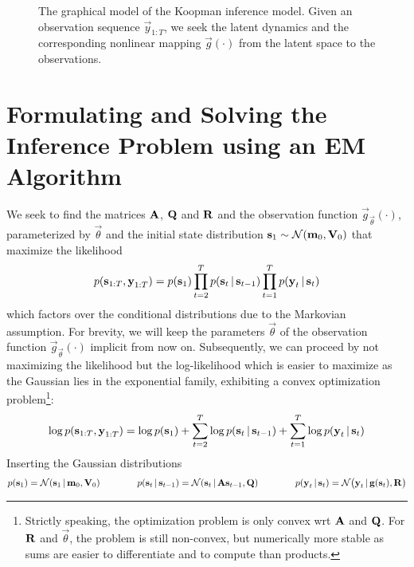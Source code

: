 \begin{figure}
	\centering
	\tikzNonlinearGaussianKoopman
	\caption[Graphical model of the Koopman inference model]{The graphical model of the Koopman inference model. Given an observation sequence \( \vec{y}_{1:T} \), we seek the latent dynamics and the corresponding nonlinear mapping \( \vec{g}(\cdot) \) from the latent space to the observations.}
	\label{fig:nonlinearGaussianKoopman}
\end{figure}

\section{Formulating and Solving the Inference Problem using an EM Algorithm}
	\label{sec:ngkDerivation}

	We seek to find the matrices \(\boldsymbol{\mathrm{A}}\), \(\boldsymbol{\mathrm{Q}}\) and \(\boldsymbol{\mathrm{R}}\) and the observation function \( \vec{g}_{\vec{\theta}}(\cdot) \), parameterized by \(\vec{\theta}\) and the initial state distribution \( \boldsymbol{\mathrm{s}}_1 \sim \mathcal{N}(\boldsymbol{\mathrm{m}}_0, \boldsymbol{\mathrm{V}}_0) \) that maximize the likelihood
	\begin{equation*}
		p(\boldsymbol{\mathrm{s}}_{1:T}, \boldsymbol{\mathrm{y}}_{1:T}) = p(\boldsymbol{\mathrm{s}}_1) \prod_{t = 2}^{T} p(\boldsymbol{\mathrm{s}}_t \,\vert\, \boldsymbol{\mathrm{s}}_{t - 1}) \prod_{t = 1}^{T} p(\boldsymbol{\mathrm{y}}_t \,\vert\, \boldsymbol{\mathrm{s}}_t)
	\end{equation*}
	which factors over the conditional distributions due to the Markovian assumption. For brevity, we will keep the parameters \( \vec{\theta} \) of the observation function \( \vec{g}_{\vec{\theta}}(\cdot) \) implicit from now on. Subsequently, we can proceed by not maximizing the likelihood but the log-likelihood which is easier to maximize as the Gaussian lies in the exponential family, exhibiting a convex optimization problem\footnote{Strictly speaking, the optimization problem is only convex \ac{wrt} \(\boldsymbol{\mathrm{A}}\) and \(\boldsymbol{\mathrm{Q}}\). For \(\boldsymbol{\mathrm{R}}\) and \(\vec{\theta}\), the problem is still non-convex, but numerically more stable as sums are easier to differentiate and to compute than products.}:
	\begin{equation*}
		\log p(\boldsymbol{\mathrm{s}}_{1:T}, \boldsymbol{\mathrm{y}}_{1:T}) = \log p(\boldsymbol{\mathrm{s}}_1) + \sum_{t = 2}^{T} \log p(\boldsymbol{\mathrm{s}}_t \,\vert\, \boldsymbol{\mathrm{s}}_{t - 1}) + \sum_{t = 1}^{T} \log p(\boldsymbol{\mathrm{y}}_t \,\vert\, \boldsymbol{\mathrm{s}}_t)
	\end{equation*}
	Inserting the Gaussian distributions
	\begin{equation*}
		p(\boldsymbol{\mathrm{s}}_1) = \mathcal{N}(\boldsymbol{\mathrm{s}}_1 \,\vert\, \boldsymbol{\mathrm{m}}_0, \boldsymbol{\mathrm{V}}_0) \qquad\qquad
		p(\boldsymbol{\mathrm{s}}_t \,\vert\, \boldsymbol{\mathrm{s}}_{t - 1}) = \mathcal{N}(\boldsymbol{\mathrm{s}}_t \,\vert\, \boldsymbol{\mathrm{A}} \boldsymbol{\mathrm{s}}_{t - 1}, \boldsymbol{\mathrm{Q}}) \qquad\qquad
		p(\boldsymbol{\mathrm{y}}_t \,\vert\, \boldsymbol{\mathrm{s}}_t) = \mathcal{N}\big(\boldsymbol{\mathrm{y}}_t \,\vert\, \boldsymbol{\mathrm{g}}(\boldsymbol{\mathrm{s}}_t), \boldsymbol{\mathrm{R}}\big)
	\end{equation*}
